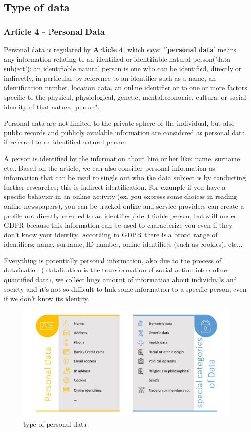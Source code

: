 \subsection{Type of data}
\subsubsection{Article 4 - Personal Data}
Personal data is regulated by \textbf{Article 4}, which says: "'\textbf{personal data}' means any information relating to an identified or identifiable natural person('data subject'); an identifiable natural person is one who can be identified, directly or indirectly, in particular by reference to an identifier such as a name, an identification number, location data, an online identifier or to one or more factors specific to the physical, physiological, genetic, mental,economic, cultural or social identity of that natural person".

Personal data are not limited to the private sphere of the individual, but also public records and publicly available information are considered as personal data if referred to an identified natural person.

A person is identified by the information about him or her like: name, surname etc.. Based on the article, we can also consider personal information as information that can be used to single out who the data subject is by conducting further researches; this is indirect identification. For example if you have a specific behavior in an online activity (ex. you express some choices in reading online newspapers), you can be tracked online and service providers can create a profile not directly referred to an identified/identifiable person, but still under GDPR because this information can be used to characterize you even if they don’t know your identity. According to GDPR there is a broad range of identifiers: name, surname, ID number, online identifiers (such as cookies), etc...

Everything is potentially personal information, also due to the process of datafication ( datafication is the transformation of social action into online quantified data), we collect huge amount of information about individuals and society and it’s not so difficult to link some information to a specific person, even if we don’t know its identity.
\begin{figure}[h]
    \centering
    \includegraphics[width=12cm]{Images/personal data.jpg}
    \caption{type of personal data}
\end{figure}

